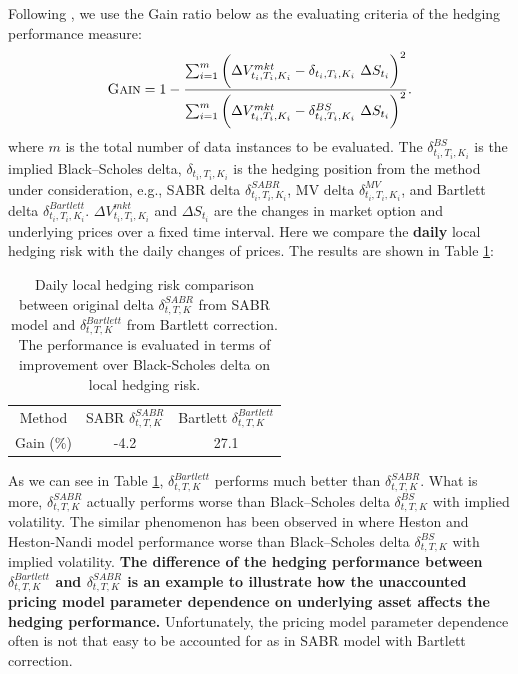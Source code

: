 \documentclass[letterpaper,12pt,titlepage,oneside,final]{book}
\numberwithin{equation}{section}
\theoremstyle{definition}
\begin{document}
\begin{itemize}
    Following \cite{hulloptimal},  we use the Gain ratio below as the evaluating criteria of the hedging performance measure:
    \begin{equation}
    \textsc{Gain}=1-\frac{\sum_{i=1}^m \bigg(\Delta V^{mkt}_{t_i,T_i,K_i}-\delta_{t_i,T_i,K_i} ~ \Delta S_{t_i} \bigg)^2}{\sum_{i=1}^m \bigg(\Delta V^{mkt}_{t_i,T_i,K_i}-\delta^{BS}_{t_i,T_i,K_i} ~ \Delta S_{t_i} \bigg)^2}.
    \label{eq:Gain}
    \end{equation}
    where $m$ is the total number of data instances to be evaluated.  The $\delta^{BS}_{t_i,T_i,K_i}$ is the implied Black–Scholes delta, $\delta_{t_i,T_i,K_i}$  is the hedging position from the method under consideration,  e.g., SABR delta $\delta^{SABR}_{t_i,T_i,K_i}$,  MV delta $\delta^{MV}_{t_i,T_i,K_i}$, and  Bartlett delta $\delta^{Bartlett}_{t_i,T_i,K_i}$. $\Delta V^{mkt}_{t_i,T_i,K_i}$ and $\Delta S_{t_i}$
    are the changes in market option and underlying prices over a fixed time interval. Here we compare the \textbf{daily} local hedging risk with the daily changes of prices. The results are shown in Table \ref{table:Bartlett}:
    \begin{table}[htp!]
        \centering
        \begin{tabular}{|c|c|c|}
            \hline
            Method& SABR $\delta^{SABR}_{t,T,K}$ & Bartlett $\delta^{Bartlett}_{t,T,K}$\\
            Gain (\%) &-4.2 & 27.1 \\
            \hline
        \end{tabular}
        \caption{Daily local hedging risk comparison between original delta $\delta^{SABR}_{t,T,K}$ from SABR model and  $\delta^{Bartlett}_{t,T,K}$ from Bartlett correction. The performance is evaluated in terms of improvement over Black-Scholes delta on local hedging risk.}
        \label{table:Bartlett}
    \end{table}
    As we can see in Table \ref{table:Bartlett}, $\delta^{Bartlett}_{t,T,K}$ performs much better than $\delta^{SABR}_{t,T,K}$. What is more, $\delta^{SABR}_{t,T,K}$ actually performs worse than Black–Scholes delta $\delta^{BS}_{t,T,K}$ with implied volatility. The similar phenomenon has been observed in \cite{lassance2018comparison} where Heston and Heston-Nandi model performance worse than Black–Scholes delta $\delta^{BS}_{t,T,K}$ with implied volatility.  \textbf{The difference of the hedging performance between $\delta^{Bartlett}_{t,T,K}$ and $\delta^{SABR}_{t,T,K}$ is an example to illustrate how the unaccounted  pricing model parameter dependence on underlying asset affects the hedging performance. }Unfortunately, the pricing model parameter dependence often is not that easy to be accounted for as in SABR model with Bartlett correction.
\end{itemize}
\end{document}
